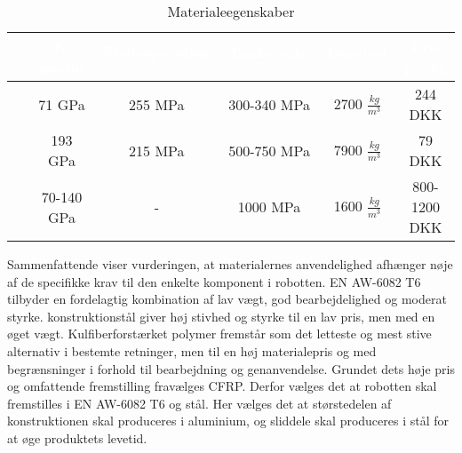 \begin{table}[H]
    \centering
    \footnotesize
    \caption{Materialeegenskaber}
    \begin{tabular}{|l|c|c|c|c|c|} \cline{2-5}
        \multicolumn{1}{c|}{~} & \multicolumn{1}{|c|}{ \cellcolor{aaublue} \textcolor{white}{E-modul}} &  \multicolumn{1}{|c|}{\cellcolor{aaublue} \textcolor{white}{\textbf{Flydespænding $\sigma_y$}}} & \multicolumn{1}{|c|}{\cellcolor{aaublue} \textcolor{white}{Trækstyrke $\sigma_{TS}$}} & \multicolumn{1}{|c|}{\cellcolor{aaublue} \textcolor{white}{Densitet $\rho$}} & \multicolumn{1}{|c|}{\cellcolor{aaublue} \textcolor{white}{Pris pr. kg}}\\ \hline
        
         \multicolumn{1}{|l|}{\cellcolor{lightgray!20}{EN AW-6082 T6}} & 71 GPa & 255 MPa & 300-340 MPa & 2700 $\frac{kg}{m^3}$ & 244 DKK\\ \hline
         
        \multicolumn{1}{|l|}{\cellcolor{lightgray!20}{Rustfri AISI 304 stål}} & 193 GPa & 215 MPa & 500-750 MPa & 7900 $\frac{kg}{m^3}$ & 79 DKK \\ \hline
        
        \multicolumn{1}{|l|}{\cellcolor{lightgray!20}{CFRP}} & 70-140 GPa & - & 1000 MPa &  1600 $\frac{kg}{m^3}$ & 800-1200 DKK \\ \hline
    \end{tabular}
    \label{tab:materialeegenskaber}
\end{table}

Sammenfattende viser vurderingen, at materialernes anvendelighed afhænger nøje af de specifikke krav til den enkelte komponent i robotten. EN AW-6082 T6  tilbyder en fordelagtig kombination af lav vægt, god bearbejdelighed og moderat styrke. konstruktionstål giver høj stivhed og styrke til en lav pris, men med en øget vægt. Kulfiberforstærket polymer fremstår som det letteste og mest stive alternativ i bestemte retninger, men til en høj materialepris og med begrænsninger i forhold til bearbejdning og genanvendelse. Grundet dets høje pris og omfattende fremstilling fravælges CFRP. Derfor vælges det at robotten skal fremstilles i EN AW-6082 T6 og stål. Her vælges det at størstedelen af konstruktionen skal produceres i aluminium, og sliddele skal produceres i stål for at øge produktets levetid.


